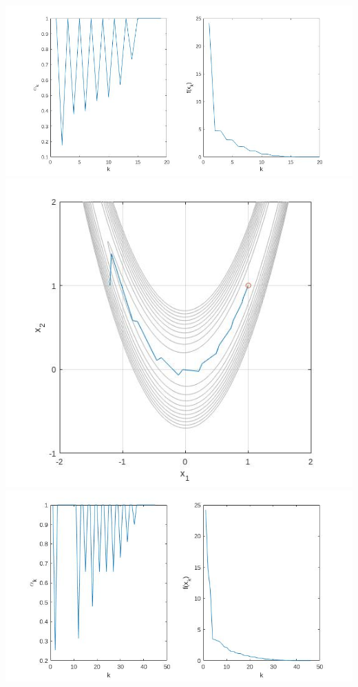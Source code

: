 \documentclass{article}
\begin{document}
\includegraphics[width=\linewidth]{a9_hard_newton_a_f.jpg}
\includegraphics[width=\linewidth]{a9_hard_newton.jpg}
\includegraphics[width=\linewidth]{a9_hard_bfgs_a_f.jpg}
\end{document}
